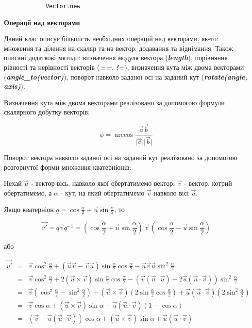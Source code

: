 \documentclass[simple,a4paper,14pt,ukrainian,utf8]{eskdtext}
\newcommand{\abs}[1]{\lvert#1\rvert} %
\begin{document}
            \begin{lstlisting}
            Vector.new
            \end{lstlisting}

            \textbf{Операції над векторами}

            Даний клас описує більшість необхідних операцій над векторами, як-то: множення та ділення на скаляр та на вектор, додавання та віднімання. Також описані додаткові мктоди: визначення модуля вектора (\textit{\textbf{length}}), порівняння рівності та нерівності векторів (\textit{\textbf{==}}, \textit{\textbf{!=}}), визначення кута між двома векторами (\textit{\textbf{angle\_to(vector)}}), поворот навколо заданої осі на заданий кут (\textit{\textbf{rotate(angle, axis)}}).

            Визначення кута між двома векторами реалізовано за допомогою формули скалярного добутку векторів:

            $$ \phi = \arccos \frac{\vec{a}\vec{b}}{\abs{\vec{a}}\abs{\vec{b}}} $$

            Поворот вектора навколо заданої осі на заданий кут реалізовано за допомогою розгорнутої форми множення кватерніонів:


            Нехай $\vec{u}$ - вектор-вісь, навколо якої обертатимемо вектор; $\vec{v}$ - вектор, котрий обертатимемо, а $\alpha$ - кут, на який обертатимемо $\vec{v}$ навколо вісі $\vec{u}$.

            Якщо кватерніон $ q = \cos \frac{\alpha}{2} + \vec{u} \sin \frac{\alpha}{2} $, то

            $$ \vec{v'} = q \vec{v} q^{-1} = \left( \cos \frac{\alpha}{2} + \vec{u} \sin \frac{\alpha}{2} \right) \, \vec{v} \, \left( \cos \frac{\alpha}{2} - \vec{u} \sin \frac{\alpha}{2} \right) $$

            або

            \begin{displaymath}
                \begin{array}{lll}
                    \vec{v'} &=& \vec{v} \cos^2 \frac{\alpha}{2} + (\vec{u}\vec{v} - \vec{v}\vec{u}) \sin \frac{\alpha}{2} \cos \frac{\alpha}{2} - \vec{u}\vec{v}\vec{u} \sin^2 \frac{\alpha}{2} \\
                    &=& \vec{v} \cos^2 \frac{\alpha}{2} + 2 (\vec{u} \times \vec{v}) \sin \frac{\alpha}{2} \cos \frac{\alpha}{2} - (\vec{v} (\vec{u} \cdot \vec{u}) - 2 \vec{u} (\vec{u} \cdot \vec{v})) \sin^2 \frac{\alpha}{2} \\
                    &=& \vec{v} (\cos^2 \frac{\alpha}{2} - \sin^2 \frac{\alpha}{2}) + (\vec{u} \times \vec{v}) (2 \sin \frac{\alpha}{2} \cos \frac{\alpha}{2}) + \vec{u} (\vec{u} \cdot \vec{v}) (2 \sin^2 \frac{\alpha}{2}) \\
                    &=& \vec{v} \cos \alpha + (\vec{u} \times \vec{v}) \sin \alpha + \vec{u} (\vec{u} \cdot \vec{v}) (1 - \cos \alpha) \\
                    &=& (\vec{v} - \vec{u} (\vec{u} \cdot \vec{v})) \cos \alpha + (\vec{u} \times \vec{v}) \sin \alpha + \vec{u} (\vec{u} \cdot \vec{v})
                \end{array}
            \end{displaymath}
\end{document}
